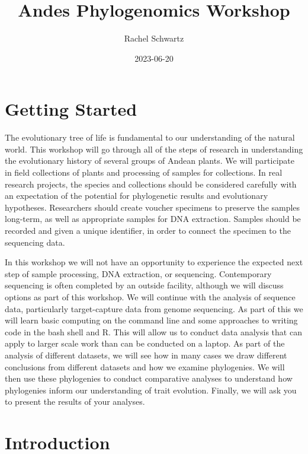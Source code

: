 \documentclass[
]{book}
\title{Andes Phylogenomics Workshop}
\author{Rachel Schwartz}
\date{2023-06-20}
\begin{document}
\maketitle

{
\setcounter{tocdepth}{1}
\tableofcontents
}
\hypertarget{getting-started}{%
\chapter{Getting Started}\label{getting-started}}

The evolutionary tree of life is fundamental to our understanding of the natural world.
This workshop will go through all of the steps of research in understanding the evolutionary history of several groups of Andean plants.
We will participate in field collections of plants and processing of samples for collections.
In real research projects, the species and collections should be considered carefully
with an expectation of the potential for phylogenetic results and evolutionary hypotheses.
Researchers should create voucher specimens to preserve the samples long-term,
as well as appropriate samples for DNA extraction.
Samples should be recorded and given a unique identifier, in order to connect the specimen to the sequencing data.

In this workshop we will not have an opportunity to experience the expected next step of
sample processing, DNA extraction, or sequencing.
Contemporary sequencing is often completed by an outside facility, although we will discuss options as part of this workshop.
We will continue with the analysis of sequence data,
particularly target-capture data from genome sequencing.
As part of this we will learn basic computing on the command line
and some approaches to writing code in the bash shell and R.
This will allow us to conduct data analysis that can apply to larger scale work than can be conducted on a laptop.
As part of the analysis of different datasets, we will see how in many cases we draw different conclusions from different datasets and how we examine phylogenies.
We will then use these phylogenies to conduct comparative analyses to understand how phylogenies inform our understanding of trait evolution.
Finally, we will ask you to present the results of your analyses.

\hypertarget{intro}{%
\chapter{Introduction}\label{intro}}
\end{document}
